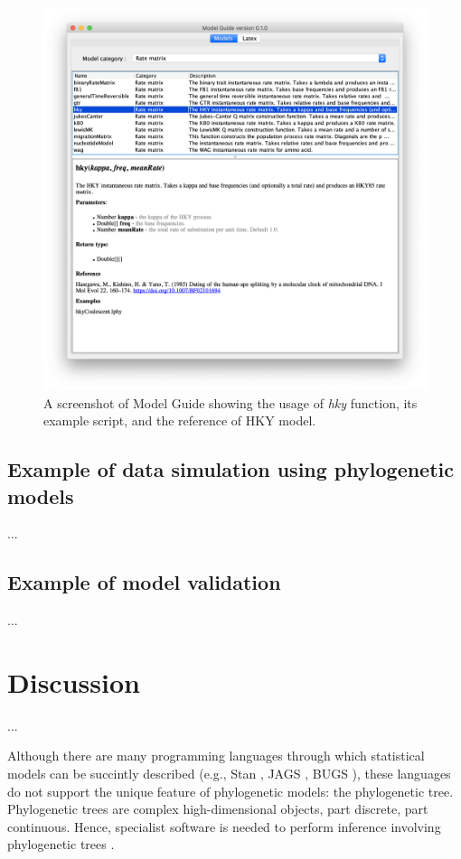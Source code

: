 \documentclass[10pt,letterpaper,table]{article}
\begin{document}
{\begin{figure}
  \includegraphics[width=\textwidth]{figs/modelguide.png}
  \caption{A screenshot of Model Guide showing the usage of \emph{hky} function, its example script, and the reference of HKY model.} 
  \label{fig:modelguide}
\end{figure}

\subsection{Example of data simulation using phylogenetic models}
...

\subsection{Example of model validation}
...


\section*{Discussion}
...

Although there are many
programming languages through which statistical 
models can be succintly described (e.g., Stan
\cite{carpenter2017stan}, JAGS \cite{plummer2003jags}, BUGS
\cite{lunn2009bugs, gilks1994language}), these languages do not
support the unique feature of phylogenetic models: the phylogenetic
tree.
Phylogenetic trees are complex high-dimensional objects, part
discrete, part continuous.
Hence, specialist software is needed to perform inference
involving phylogenetic trees
\cite{hohna2016revbayes,bouckaert2019beastanalysis}.

}
\end{document}
